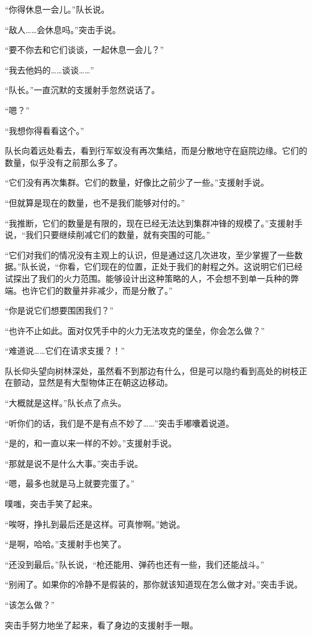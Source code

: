 “你得休息一会儿。”队长说。

“敌人……会休息吗。”突击手说。

“要不你去和它们谈谈，一起休息一会儿？”

“我去他妈的……谈谈……”

“队长。”一直沉默的支援射手忽然说话了。

“嗯？”

“我想你得看看这个。”

队长向着远处看去，看到行军蚁没有再次集结，而是分散地守在庭院边缘。它们的数量，似乎没有之前那么多了。

“它们没有再次集群。它们的数量，好像比之前少了一些。”支援射手说。

“但就算是现在的数量，也不是我们能够对付的。”

“我推断，它们的数量是有限的，现在已经无法达到集群冲锋的规模了。”支援射手说，“我们只要继续削减它们的数量，就有突围的可能。”

“它们对我们的情况没有主观上的认识，但是通过这几次进攻，至少掌握了一些数据。”队长说，“你看，它们现在的位置，正处于我们的射程之外。这说明它们已经试探出了我们的火力范围。能够设计出这种策略的人，不会想不到单一兵种的弊端。也许它们的数量并非减少，而是分散了。”

“你是说它们想要围困我们？”

“也许不止如此。面对仅凭手中的火力无法攻克的堡垒，你会怎么做？”

“难道说……它们在请求支援？！”

队长仰头望向树林深处，虽然看不到那边有什么，但是可以隐约看到高处的树枝正在颤动，显然是有大型物体正在朝这边移动。

“大概就是这样。”队长点了点头。

“听你们的话，我们是不是有点不妙了……”突击手嘟囔着说道。

“是的，和一直以来一样的不妙。”支援射手说。

“那就是说不是什么大事。”突击手说。

“嗯，最多也就是马上就要完蛋了。”

噗嗤，突击手笑了起来。

“唉呀，挣扎到最后还是这样。可真惨啊。”她说。

“是啊，哈哈。”支援射手也笑了。

“还没到最后。”队长说，“枪还能用、弹药也还有一些，我们还能战斗。”

“别闹了。如果你的冷静不是假装的，那你就该知道现在怎么做才对。”突击手说。

“该怎么做？”

突击手努力地坐了起来，看了身边的支援射手一眼。

